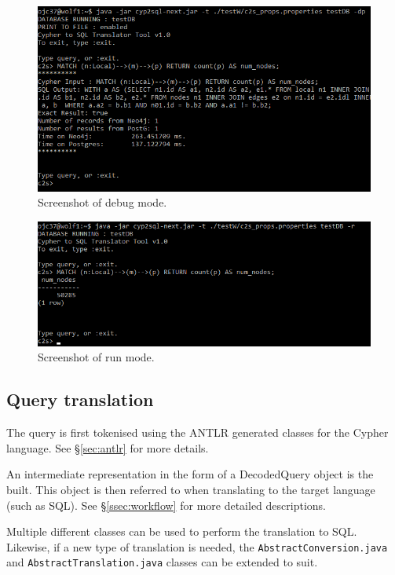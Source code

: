 \documentclass[letterpaper]{ltxdoc}
\begin{document}
\begin{figure}[h]
\centerline{\includegraphics[width=\textwidth,height=\textheight,keepaspectratio]{ss1.png}}
\caption{Screenshot of debug mode.}
\label{ss1}
\end{figure}

\begin{figure}[h]
\centerline{\includegraphics[width=\textwidth,height=\textheight,keepaspectratio]{ss2.png}}
\caption{Screenshot of run mode.}
\label{ss2}
\end{figure}


\subsection{Query translation}
The query is first tokenised using the ANTLR generated classes for the Cypher language. See \S \ref{sec:antlr} for more details.

An intermediate representation in the form of a DecodedQuery object is the built. This object is then referred to when translating to the target language (such as SQL). See \S \ref{ssec:workflow} for more detailed descriptions.

Multiple different classes can be used to perform the translation to SQL. Likewise, if a new type of translation is needed, the \texttt{AbstractConversion.java} and \texttt{AbstractTranslation.java} classes can be extended to suit.
\end{document}
